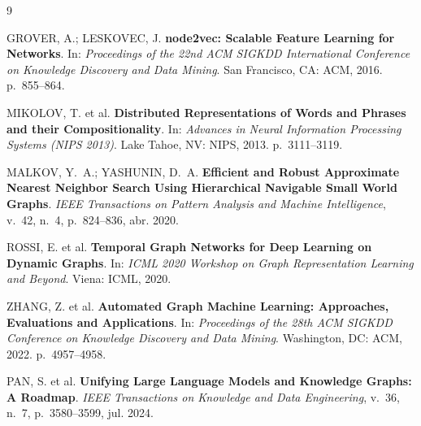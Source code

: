 \documentclass[11pt,a4paper]{article}
\begin{document}
\begin{thebibliography}{9}

GROVER, A.; LESKOVEC, J\@. \textbf{node2vec: Scalable Feature Learning for Networks}. In:
\textit{Proceedings of the 22nd ACM SIGKDD International Conference on Knowledge Discovery and
Data Mining}. San Francisco, CA: ACM, 2016. p.~855--864.

MIKOLOV, T\@. et al. \textbf{Distributed Representations of Words and Phrases and their
Compositionality}. In: \textit{Advances in Neural Information Processing Systems (NIPS 2013)}.
Lake Tahoe, NV: NIPS, 2013. p.~3111--3119.

MALKOV, Y.~A.; YASHUNIN, D.~A\@. \textbf{Efficient and Robust Approximate Nearest Neighbor Search
Using Hierarchical Navigable Small World Graphs}. \textit{IEEE Transactions on Pattern Analysis
and Machine Intelligence}, v.~42, n.~4, p.~824--836, abr. 2020.

ROSSI, E\@. et al. \textbf{Temporal Graph Networks for Deep Learning on Dynamic Graphs}. In:
\textit{ICML 2020 Workshop on Graph Representation Learning and Beyond}. Viena: ICML, 2020.

ZHANG, Z\@. et al. \textbf{Automated Graph Machine Learning: Approaches, Evaluations and
Applications}. In: \textit{Proceedings of the 28th ACM SIGKDD Conference on Knowledge Discovery
and Data Mining}. Washington, DC: ACM, 2022. p.~4957--4958.

PAN, S\@. et al. \textbf{Unifying Large Language Models and Knowledge Graphs: A Roadmap}.
\textit{IEEE Transactions on Knowledge and Data Engineering}, v.~36, n.~7, p.~3580--3599,
jul. 2024.

\end{thebibliography}
\end{document}
